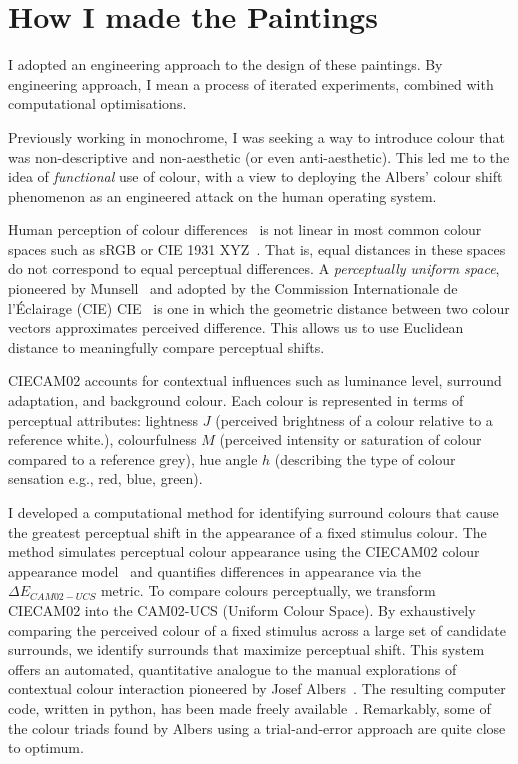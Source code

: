 \documentclass[12pt]{article}
\begin{document}
\section{How I made the Paintings}\label{sec:process}
I adopted an engineering approach to the design of these paintings. By engineering approach, I mean a process of iterated experiments, combined with computational optimisations. 

Previously working in monochrome, I was seeking a way to introduce colour that was non-descriptive and non-aesthetic (or even anti-aesthetic). This led me to the idea of \emph{functional} use of colour, with a view to deploying the Albers' colour shift phenomenon as an engineered attack on the human operating system.

Human perception of colour differences~\cite{MacAdam1942} is not linear in most common colour spaces such as sRGB or CIE 1931 XYZ~\cite{Luo2001CIECAM02}. That is, equal distances in these spaces do not correspond to equal perceptual differences. A \emph{perceptually uniform space}, pioneered by Munsell~\cite{Munsell1915} and adopted by the Commission Internationale de l'\'{E}clairage (CIE) CIE~\cite{CIE1976,CIE1978Uniform,Luo2001CIEDE2000} 
is one in which the geometric distance between two colour vectors approximates perceived difference. This allows us to use Euclidean distance to meaningfully compare perceptual shifts.

CIECAM02 accounts for contextual influences such as luminance level, surround adaptation, and background colour. Each colour is represented in terms of perceptual attributes: lightness $J$ (perceived brightness of a colour relative to a reference white.), colourfulness $M$ (perceived intensity or saturation of colour compared to a reference grey), hue angle $h$ (describing the type of colour sensation e.g., red, blue, green).

I developed a computational method for identifying surround colours that cause the greatest perceptual shift in the appearance of a fixed stimulus colour. The method simulates perceptual colour appearance using the CIECAM02 colour appearance model~\cite{Luo2001CIECAM02,CIE1592004} and quantifies differences in appearance via the $\Delta E_{CAM02-UCS}$ metric. To compare colours perceptually, we transform CIECAM02 into the CAM02-UCS (Uniform Colour Space). By exhaustively comparing the perceived colour of a fixed stimulus across a large set of candidate surrounds, we identify surrounds that maximize perceptual shift. This system offers an automated, quantitative analogue to the manual explorations of contextual colour interaction pioneered by Josef Albers~\cite{albers}. The resulting computer code, written in python, has been made freely available~\cite{grant2025colourshift}. Remarkably, some of the colour triads found by Albers using a trial-and-error approach are quite close to optimum. 
\end{document}
